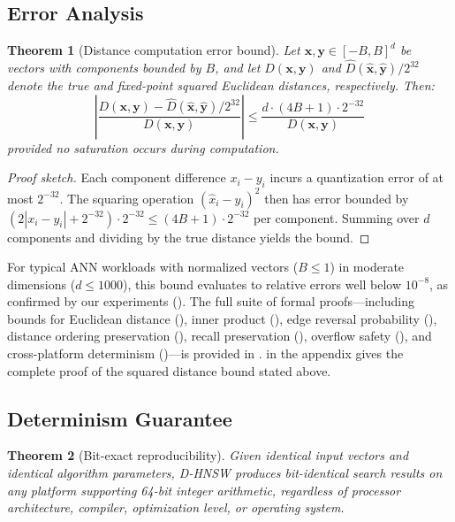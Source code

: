 \documentclass[10pt,journal]{IEEEtran}
\newtheorem{theorem}{Theorem}
\newcommand{\dhnsw}{\textsc{D-HNSW}}
\begin{document}
\subsection{Error Analysis}

\begin{theorem}[Distance computation error bound]
\label{thm:error}
Let $\mathbf{x}, \mathbf{y} \in [-B, B]^d$ be vectors with components bounded by $B$, and let $D(\mathbf{x}, \mathbf{y})$ and $\hat{D}(\hat{\mathbf{x}}, \hat{\mathbf{y}})/2^{32}$ denote the true and fixed-point squared Euclidean distances, respectively. Then:
\begin{equation}
  \left|\frac{D(\mathbf{x}, \mathbf{y}) - \hat{D}(\hat{\mathbf{x}}, \hat{\mathbf{y}})/2^{32}}{D(\mathbf{x}, \mathbf{y})}\right| \leq \frac{d \cdot (4B + 1) \cdot 2^{-32}}{D(\mathbf{x}, \mathbf{y})}
\end{equation}
provided no saturation occurs during computation.
\end{theorem}

\begin{proof}[Proof sketch]
Each component difference $x_i - y_i$ incurs a quantization error of at most $2^{-32}$. The squaring operation $(\hat{x}_i - \hat{y}_i)^2$ then has error bounded by $(2|x_i - y_i| + 2^{-32}) \cdot 2^{-32} \leq (4B + 1) \cdot 2^{-32}$ per component. Summing over $d$ components and dividing by the true distance yields the bound.
\end{proof}

For typical ANN workloads with normalized vectors ($B \leq 1$) in moderate dimensions ($d \leq 1000$), this bound evaluates to relative errors well below $10^{-8}$, as confirmed by our experiments (). The full suite of formal proofs---including bounds for Euclidean distance (), inner product (), edge reversal probability (), distance ordering preservation (), recall preservation (), overflow safety (), and cross-platform determinism ()---is provided in .  in the appendix gives the complete proof of the squared distance bound stated above.

\subsection{Determinism Guarantee}

\begin{theorem}[Bit-exact reproducibility]
\label{thm:determinism}
Given identical input vectors and identical algorithm parameters, \dhnsw{} produces bit-identical search results on any platform supporting 64-bit integer arithmetic, regardless of processor architecture, compiler, optimization level, or operating system.
\end{theorem}
\end{document}
